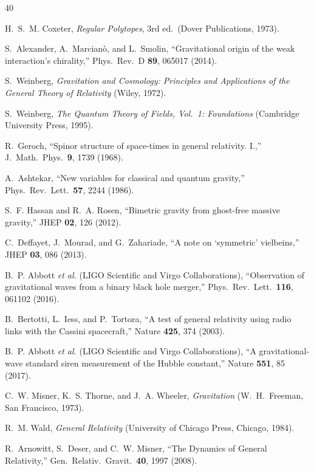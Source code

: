 \documentclass[aps,prd,preprint,superscriptaddress,showpacs,preprintnumbers,amsmath,amssymb,nofootinbib]{revtex4-2}
\begin{document}
\begin{thebibliography}{40}

H.~S.~M. Coxeter, \emph{Regular Polytopes}, 3rd ed.\ (Dover Publications, 1973).

S.~Alexander, A.~Marcian\`o, and L.~Smolin, ``Gravitational origin of the weak interaction's chirality,'' Phys.\ Rev.\ D \textbf{89}, 065017 (2014).

S.~Weinberg, \emph{Gravitation and Cosmology: Principles and Applications of the General Theory of Relativity} (Wiley, 1972).

S.~Weinberg, \emph{The Quantum Theory of Fields, Vol.\ 1: Foundations} (Cambridge University Press, 1995).

R.~Geroch, ``Spinor structure of space-times in general relativity. I.,'' J.\ Math.\ Phys.\ \textbf{9}, 1739 (1968).

A.~Ashtekar, ``New variables for classical and quantum gravity,'' Phys.\ Rev.\ Lett.\ \textbf{57}, 2244 (1986).

S.~F. Hassan and R.~A. Rosen, ``Bimetric gravity from ghost-free massive gravity,'' JHEP \textbf{02}, 126 (2012).

C.~Deffayet, J.~Mourad, and G.~Zahariade, ``A note on `symmetric' vielbeins,'' JHEP \textbf{03}, 086 (2013).

B.~P. Abbott \textit{et al.} (LIGO Scientific and Virgo Collaborations), ``Observation of gravitational waves from a binary black hole merger,'' Phys.\ Rev.\ Lett.\ \textbf{116}, 061102 (2016).

B.~Bertotti, L.~Iess, and P.~Tortora, ``A test of general relativity using radio links with the Cassini spacecraft,'' Nature \textbf{425}, 374 (2003).

B.~P. Abbott \textit{et al.} (LIGO Scientific and Virgo Collaborations), ``A gravitational-wave standard siren measurement of the Hubble constant,'' Nature \textbf{551}, 85 (2017).

C.~W. Misner, K.~S. Thorne, and J.~A. Wheeler, \emph{Gravitation} (W.~H.~Freeman, San Francisco, 1973).

R.~M. Wald, \emph{General Relativity} (University of Chicago Press, Chicago, 1984).

R.~Arnowitt, S.~Deser, and C.~W. Misner, ``The Dynamics of General Relativity,'' Gen.\ Relativ.\ Gravit.\ \textbf{40}, 1997 (2008).


\end{thebibliography}
\end{document}
